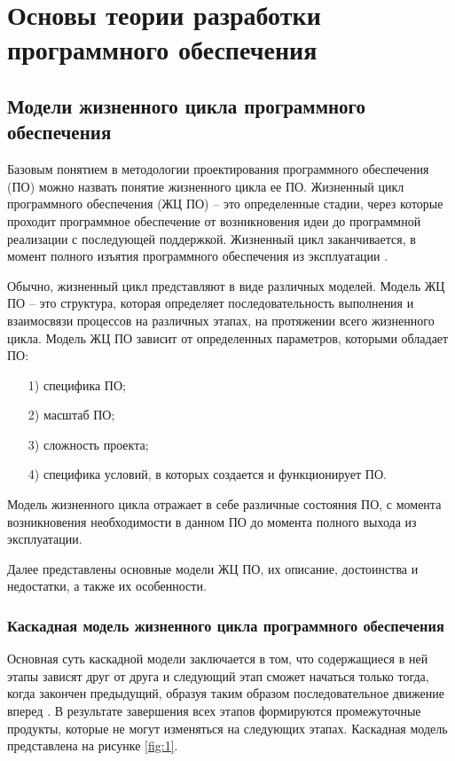 \chapter{Основы теории разработки программного обеспечения}

\section{Модели жизненного цикла программного обеспечения}

Базовым понятием в методологии проектирования программного обеспечения (ПО) можно назвать понятие жизненного цикла ее ПО. Жизненный цикл программного обеспечения (ЖЦ ПО) -- это определенные стадии, через которые проходит программное обеспечение от возникновения идеи до программной реализации с последующей поддержкой. Жизненный цикл заканчивается, в момент полного изъятия программного обеспечения из эксплуатации \cite{6, 22}.

Обычно, жизненный цикл представляют в виде различных моделей. Модель ЖЦ ПО --\: это структура, которая определяет последовательность выполнения и взаимосвязи процессов на различных этапах, на протяжении всего жизненного цикла. Модель ЖЦ ПО зависит от определенных параметров, которыми обладает ПО:
\begin{enumerate}
    \item [1)] специфика ПО;
    \item [2)] масштаб ПО;
    \item [3)] сложность проекта;
    \item [4)] специфика условий, в которых создается и функционирует ПО.
\end{enumerate}

Модель жизненного цикла отражает в себе различные состояния ПО, с момента возникновения необходимости в данном ПО до момента полного выхода из эксплуатации.

Далее представлены основные модели ЖЦ ПО, их описание, достоинства и недостатки, а также их особенности.

\subsection{Каскадная модель жизненного цикла программного обеспечения}

Основная суть каскадной модели заключается в том, что содержащиеся в ней этапы зависят друг от друга и следующий этап сможет начаться только тогда, когда закончен предыдущий, образуя таким образом последовательное движение вперед \cite{1, 19}.
В результате завершения всех этапов формируются промежуточные продукты, которые не могут изменяться на следующих этапах. Каскадная модель представлена на рисунке \ref{fig:1}.

